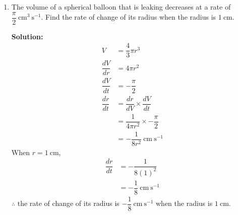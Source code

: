 \documentclass{report}
\newcommand{\sol}{\textbf{Solution:}}
\begin{document}
\begin{enumerate}[leftmargin=*]
\begin{enumerate}
                    \sol{}
                    \begin{align*}
                        y                & = x(3 x+1)(2 x-3)    \\
                                         & = x(6 x^2-9 x+2 x-3) \\
                                         & = 6 x^3-7 x^2-3 x    \\
                        \dfrac{d y}{d x} & = 18 x^2-14 x-3
                    \end{align*}

                    \newpage
              \item The volume of a spherical balloon that is leaking decreases at a rate of
                    $\dfrac{\pi}{2} \mathrm{~cm}^3 \mathrm{~s}^{-1}$. Find the rate of change of
                    its radius when the radius is $1 \mathrm{~cm}$.

                    \sol{}
                    \begin{align*}
                        V                & = \dfrac{4}{3} \pi r^3                            \\
                        \dfrac{d V}{d r} & = 4 \pi r^2                                       \\
                        \dfrac{dV}{dt}   & = -\dfrac{\pi}{2}                                 \\
                        \dfrac{dr}{dt}   & = \dfrac{dr}{dV} \times \dfrac{dV}{dt}            \\
                                         & = \dfrac{1}{4 \pi r^2} \times -\dfrac{\pi}{2}     \\
                                         & = -\dfrac{1}{8 r^2} \mathrm{~cm} \mathrm{~s}^{-1}
                    \end{align*}
                    When $r = 1 \mathrm{~cm}$,
                    \begin{align*}
                        \dfrac{dr}{dt} & = -\dfrac{1}{8(1)^2}                          \\
                                       & = -\dfrac{1}{8} \mathrm{~cm} \mathrm{~s}^{-1}
                    \end{align*}
                    $\therefore$ the rate of change of its radius is $-\dfrac{1}{8} \mathrm{~cm}
                        \mathrm{~s}^{-1}$ when the radius is $1 \mathrm{~cm}$.
          \end{enumerate}


\end{enumerate}
\end{document}
